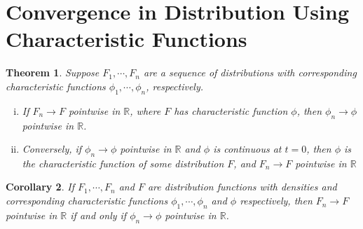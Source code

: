 \documentclass[12pt]{amsbook}
\newcommand{\rr}{\mathbb{R}}
\theoremstyle{plain}
\newtheorem{theorem}{Theorem}
\newtheorem{corollary}[theorem]{Corollary}
\theoremstyle{definition}
\newtheorem*{definition}{Definition}
\theoremstyle{remark}
\numberwithin{equation}{section}  %
\begin{document}
	\section{Convergence in Distribution Using Characteristic Functions}
	\begin{theorem}\label{thm:conv-char-dist}
		Suppose $F_{1}, \cdots, F_{n}$ are a sequence of distributions
		with corresponding characteristic functions
		$\phi_{1}, \cdots, \phi_{n}$, respectively. 
		\begin{enumerate}[(i)]
			\item If $F_{n} \to F$ pointwise in $\rr$,
				where $F$ has characteristic function
				$\phi$, then $\phi_{n} \to \phi$ pointwise in $\rr$.
			\item Conversely, if  $\phi_{n} \to \phi$ pointwise in $\rr$ and 
				$\phi$ is continuous at $t = 0$, then $\phi$ is the characteristic
				function of some distribution $F$, and $F_{n} \to F$ pointwise
				in $\rr$
		\end{enumerate}
	\end{theorem}
	\begin{corollary}
		If $F_{1}, \cdots, F_{n}$ and $F$ are distribution functions with densities
		and corresponding characteristic functions $\phi_{1}, \cdots, \phi_{n}$ and
		$\phi$ respectively, then $F_{n} \to F$ pointwise in $\rr$ if and only if
		$\phi_{n} \to \phi$ pointwise in $\rr$.
	\end{corollary}
\end{document}
